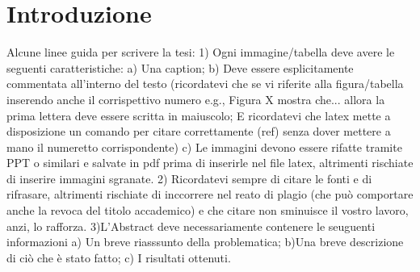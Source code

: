 \chapter{Introduzione}

\begin{comment}
Ciò che viene scritto in questo enviroment non sarà mostrato nel pdf.
Questo comando è utile per nascondere un intero paragrafo senza eliminarlo dal file sorgente. 
\end{comment}
Alcune linee guida per scrivere la tesi: 1) Ogni immagine/tabella deve avere le seguenti caratteristiche: a) Una caption; b) Deve essere esplicitamente commentata all'interno del testo (ricordatevi che se vi riferite alla figura/tabella inserendo anche il corrispettivo numero e.g., Figura X mostra che... allora la prima lettera deve essere scritta in maiuscolo; E ricordatevi che latex mette a disposizione un comando per citare correttamente (ref) senza dover mettere a mano il numeretto corrispondente) c) Le immagini devono essere rifatte tramite PPT o similari e salvate in pdf prima di inserirle nel file latex, altrimenti rischiate di inserire immagini sgranate. 2) Ricordatevi sempre di citare le fonti e di rifrasare, altrimenti rischiate di inccorrere nel reato di plagio (che può comportare anche la revoca del titolo accademico) e che citare non sminuisce il vostro lavoro, anzi, lo rafforza. 3)L'Abstract deve necessariamente contenere le seuguenti informazioni a) Un breve riasssunto della problematica; b)Una breve descrizione di ciò che è stato fatto; c) I risultati ottenuti.
